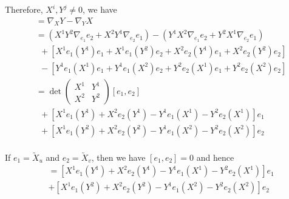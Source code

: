 \documentclass[12pt]{article}
\begin{document}
Therefore, $X^i,Y^j\neq 0$, we have \begin{align*}
    [X,Y] &= \nabla_XY - \nabla_YX\\
    &=(X^1Y^2\nabla_{e_1}e_2 +
    X^2Y^1\nabla_{e_2}e_1)-(Y^1X^2\nabla_{e_1}e_2 +
    Y^2X^1\nabla_{e_2}e_1)\\
    &~~+[X^1e_1(Y^1)e_1 + X^1e_1(Y^2)e_2+ X^2e_2(Y^1)e_1+X^2e_2(Y^2)e_2]\\
    &~~-[Y^1e_1(X^1)e_1 + Y^1e_1(X^2)e_2+ Y^2e_2(X^1)e_1+Y^2e_2(X^2)e_2]\\
    &=\det\begin{pmatrix}
         X^1&Y^1\\
         X^2&Y^2
    \end{pmatrix}[e_1,e_2]\\
    &~~+[X^1e_1(Y^1)+X^2e_2(Y^1)-Y^1e_1(X^1)-Y^2e_2(X^1)]e_1\\
    &~~+[X^1e_1(Y^2)+X^2e_2(Y^2)-Y^1e_1(X^2)-Y^2e_2(X^2)]e_2\\
\end{align*}

If $e_1 = \utilde{X}_u$ and $e_2 = \utilde{X}_v$, then we have $[e_1,e_2] = 0$ and hence
\begin{align*}
    [X,Y] &= [X^1e_1(Y^1)+X^2e_2(Y^1)-Y^1e_1(X^1)-Y^2e_2(X^1)]e_1\\
    &+[X^1e_1(Y^2)+X^2e_2(Y^2)-Y^1e_1(X^2)-Y^2e_2(X^2)]e_2\\
\end{align*}
\end{document}
